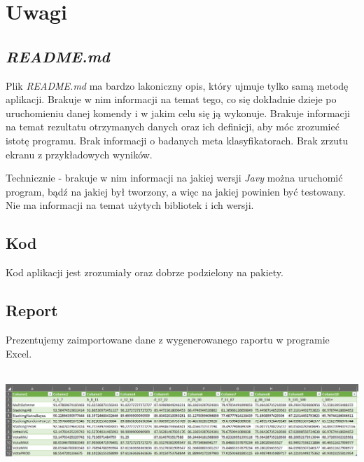 \documentclass[graybox]{svmult}
\begin{document}
\section{Uwagi}

\subsection{\textit{README.md}}

Plik \textit{README.md} ma bardzo lakoniczny opis, który ujmuje tylko samą metodę aplikacji. Brakuje w nim informacji na temat tego, co się dokładnie dzieje po uruchomieniu danej komendy i w jakim celu się ją wykonuje. Brakuje informacji na temat rezultatu otrzymanych danych oraz ich definicji, aby móc zrozumieć istotę programu. Brak informacji o badanych meta klasyfikatorach. Brak zrzutu ekranu z przykładowych wyników.

Technicznie - brakuje w nim informacji na jakiej wersji \emph{Javy} można uruchomić program, bądź na jakiej był tworzony, a więc na jakiej powinien być testowany. Nie ma informacji na temat użytych bibliotek i ich wersji.

\subsection{Kod}

Kod aplikacji jest zrozumiały oraz dobrze podzielony na pakiety.

\subsection{Report}

Prezentujemy zaimportowane dane z wygenerowanego raportu w programie Excel. \\

\begin{frame}{}
\hbox{\hspace{-5.0em} \includegraphics[scale=0.45]{img/results_loaded.png}}
\end{frame}
%
\end{document}
